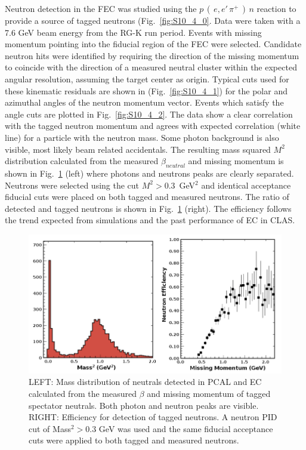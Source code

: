 Neutron detection in the FEC was studied using the $p\,(\,e,e'\,\pi^+\,)\,n$ reaction to provide a source of tagged neutrons (Fig.~\ref{fig:S10_4_0}. Data were taken with a 7.6 GeV beam energy from the RG-K run period.  Events with missing momentum pointing into the fiducial region of the FEC were selected.  Candidate neutron hits were identified by requiring the direction of the missing momentum to coincide with the direction of a measured neutral cluster within the expected angular resolution, assuming the target center as origin.  Typical cuts used for these kinematic residuals are shown in (Fig.~\ref{fig:S10_4_1}) for the polar and azimuthal angles of the neutron momentum vector.  Events which satisfy the angle cuts are plotted in Fig.~\ref{fig:S10_4_2}.  The data show a clear correlation with the tagged neutron momentum and agrees with expected correlation (white line) for a particle with the neutron mass.  Some photon background is also visible, most likely beam related accidentals. The resulting mass squared $M^2$ distribution calculated from the measured $\beta_{neutral}$ and missing momentum is shown in Fig.~\ref{fig:S10_4_3} (left) where photons and neutrons peaks are clearly separated.  Neutrons were selected using the cut $M^2 > 0.3$~GeV$^2$ and identical acceptance fiducial cuts were placed on both tagged and measured neutrons.  The ratio of detected and tagged neutrons is shown in Fig.~\ref{fig:S10_4_3} (right).  The efficiency follows the trend expected from simulations and the past performance of EC in CLAS.     

\begin{figure}[h]
\centering
\includegraphics[width=1.0\columnwidth,keepaspectratio]{img/S10_4_3.png}
\caption[]{LEFT: Mass distribution of neutrals detected in PCAL and EC calculated from the measured $\beta$ and missing momentum of tagged spectator neutrals.  Both photon and neutron peaks are visible. RIGHT: Efficiency for detection of tagged neutrons.  A neutron PID cut of Mass$^2>$0.3 GeV was used and the same fiducial acceptance cuts were applied to both tagged and measured neutrons.}
\label{fig:S10_4_3}
\end{figure}




